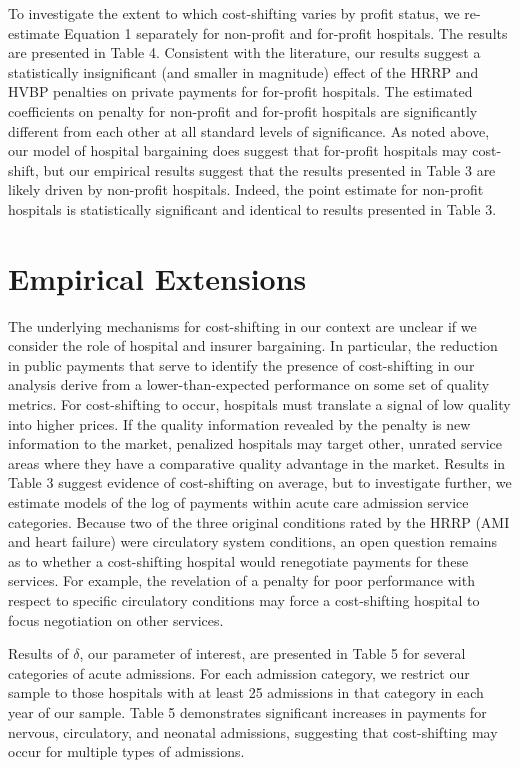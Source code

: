 \documentclass[12pt]{article}
\begin{document}
To investigate the extent to which cost-shifting varies by profit status, we re-estimate Equation 1 separately for non-profit and for-profit hospitals.  The results are presented in Table 4.  Consistent with the literature, our results suggest a statistically insignificant (and smaller in magnitude) effect of the HRRP and HVBP penalties on private payments for for-profit hospitals.  The estimated coefficients on penalty for non-profit and for-profit hospitals are significantly different from each other at all standard levels of significance.  As noted above, our model of hospital bargaining does suggest that for-profit hospitals may cost-shift, but our empirical results suggest that the results presented in Table 3 are likely driven by non-profit hospitals.  Indeed, the point estimate for non-profit hospitals is statistically significant and identical to results presented in Table 3.





\section{Empirical Extensions}
\label{sec:Ext}
The underlying mechanisms for cost-shifting in our context are unclear if we consider the role of hospital and insurer bargaining. In particular, the reduction in public payments that serve to identify the presence of cost-shifting in our analysis derive from a lower-than-expected performance on some set of quality metrics. For cost-shifting to occur, hospitals must translate a signal of low quality into higher prices.  If the quality information revealed by the penalty is new information to the market, penalized hospitals may target other, unrated service areas where they have a comparative quality advantage in the market.  Results in Table 3 suggest evidence of cost-shifting on average, but to investigate further, we estimate models of the log of payments within acute care admission service categories.  Because two of the three original conditions rated by the HRRP (AMI and heart failure) were circulatory system conditions, an open question remains as to whether a cost-shifting hospital would renegotiate payments for these services.  For example, the revelation of a penalty for poor performance with respect to specific circulatory conditions may force a cost-shifting hospital to focus negotiation on other services.  

Results of $\delta$, our parameter of interest, are presented in Table 5 for several categories of acute admissions.  For each admission category, we restrict our sample to those hospitals with at least 25 admissions in that category in each year of our sample.  Table 5 demonstrates significant increases in payments for nervous, circulatory, and neonatal admissions, suggesting that cost-shifting may occur for multiple types of admissions.  
\end{document}
